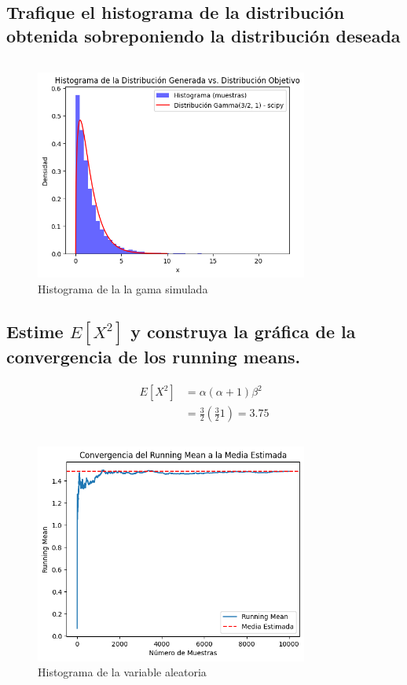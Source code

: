 \documentclass{article}
\begin{document}
\subsection{Trafique el histograma de la distribución obtenida sobreponiendo la distribución deseada}
\begin{pythonbox}
	\inputminted{python}{code/accept_graph.py}
\end{pythonbox}
\begin{figure}[H]
	\centering
	\includegraphics[width=0.8\textwidth]{assets/gamma.png}
	\caption{Histograma de la la gama simulada}
\end{figure}


\subsection{Estime $E[X^2]$ y construya la gráfica de la convergencia de los running means.}

\[
	\begin{split}
		E[X^2] & = \alpha(\alpha + 1)\beta^2      \\
		       & = \frac{3}{2}(\frac{3}{2}1)=3.75
	\end{split}
\]
\begin{pythonbox}[title={The }]
	\inputminted{python}{code/test.py}
\end{pythonbox}

\begin{figure}[H]
	\centering
	\includegraphics[width=0.8\textwidth]{assets/gama_sum.png}
	\caption{Histograma de la variable aleatoria}
\end{figure}
\end{document}
